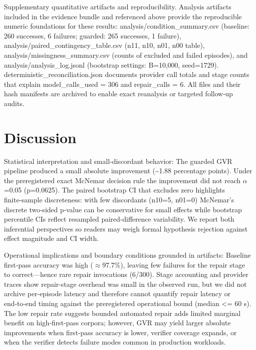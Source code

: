 \documentclass[conference]{IEEEtran}
\begin{document}
Supplementary quantitative artifacts and reproducibility. Analysis artifacts included in the evidence bundle and referenced above provide the reproducible numeric foundations for these results: analysis/condition\_summary.csv (baseline: 260 successes, 6 failures; guarded: 265 successes, 1 failure), analysis/paired\_contingency\_table.csv (n11, n10, n01, n00 table), analysis/missingness\_summary.csv (counts of excluded and failed episodes), and analysis/analysis\_log.jsonl (bootstrap settings: B=10,000, seed=1729). deterministic\_reconciliation.json documents provider call totals and stage counts that explain model\_calls\_used = 306 and repair\_calls = 6. All files and their hash manifests are archived to enable exact reanalysis or targeted follow‑up audits.

\section{Discussion}
Statistical interpretation and small‑discordant behavior: The guarded GVR pipeline produced a small absolute improvement (\textasciitilde{}1.88 percentage points). Under the preregistered exact McNemar decision rule the improvement did not reach \ensuremath{\alpha}=0.05 (p=0.0625). The paired bootstrap CI that excludes zero highlights finite‑sample discreteness: with few discordants (n10=5, n01=0) McNemar's discrete two‑sided p‑value can be conservative for small effects while bootstrap percentile CIs reflect resampled paired‑difference variability. We report both inferential perspectives so readers may weigh formal hypothesis rejection against effect magnitude and CI width.

Operational implications and boundary conditions grounded in artifacts: Baseline first‑pass accuracy was high (\ensuremath{\approx}97.7\%), leaving few failures for the repair stage to correct---hence rare repair invocations (6/300). Stage accounting and provider traces show repair-stage overhead was small in the observed run, but we did not archive per‑episode latency and therefore cannot quantify repair latency or end‑to‑end timing against the preregistered operational bound (median <= 60 s). The low repair rate suggests bounded automated repair adds limited marginal benefit on high‑first‑pass corpora; however, GVR may yield larger absolute improvements when first‑pass accuracy is lower, verifier coverage expands, or when the verifier detects failure modes common in production workloads.
\end{document}
